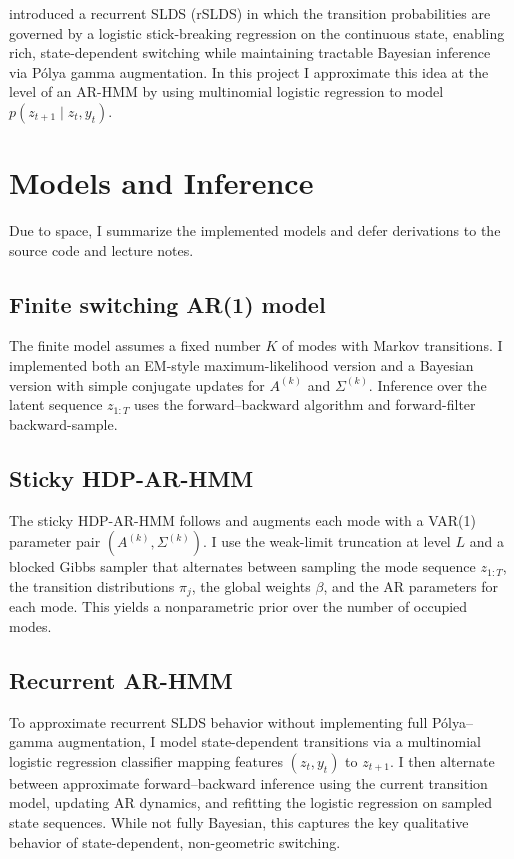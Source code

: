 \documentclass[11pt]{article}
\begin{document}
\citet{linderman2017} introduced a recurrent SLDS (rSLDS) in which the
transition probabilities are governed by a logistic stick-breaking
regression on the continuous state, enabling rich, state-dependent
switching while maintaining tractable Bayesian inference via P{\'o}lya
gamma augmentation. In this project I approximate this idea at the
level of an AR-HMM by using multinomial logistic regression to model
$p(z_{t+1}\mid z_t, y_t)$.

\section{Models and Inference}

Due to space, I summarize the implemented models and defer derivations
to the source code and lecture notes.

\subsection{Finite switching AR(1) model}

The finite model assumes a fixed number $K$ of modes with Markov
transitions. I implemented both an EM-style maximum-likelihood version
and a Bayesian version with simple conjugate updates for $A^{(k)}$ and
$\Sigma^{(k)}$. Inference over the latent sequence $z_{1:T}$ uses the
forward--backward algorithm and forward-filter backward-sample.

\subsection{Sticky HDP-AR-HMM}

The sticky HDP-AR-HMM follows \citet{fox2008} and augments each mode
with a VAR(1) parameter pair $(A^{(k)}, \Sigma^{(k)})$. I use the
weak-limit truncation at level $L$ and a blocked Gibbs sampler that
alternates between sampling the mode sequence $z_{1:T}$, the
transition distributions $\pi_j$, the global weights $\beta$, and the
AR parameters for each mode. This yields a nonparametric prior over the
number of occupied modes.

\subsection{Recurrent AR-HMM}

To approximate recurrent SLDS behavior without implementing full
P{\'o}lya--gamma augmentation, I model state-dependent transitions via
a multinomial logistic regression classifier mapping features
$(z_t, y_t)$ to $z_{t+1}$. I then alternate between approximate
forward--backward inference using the current transition model,
updating AR dynamics, and refitting the logistic regression on sampled
state sequences. While not fully Bayesian, this captures the key
qualitative behavior of state-dependent, non-geometric switching.
\end{document}
